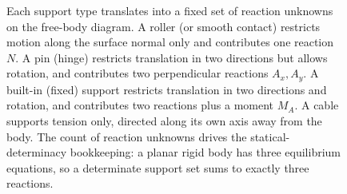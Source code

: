 \begin{figure}[htbp]
\caption[Canonical two-dimensional supports and their reactions]{Each
support type translates into a fixed set of reaction unknowns on the
free-body diagram. A roller (or smooth contact) restricts motion along
the surface normal only and contributes one reaction $N$. A pin (hinge)
restricts translation in two directions but allows rotation, and
contributes two perpendicular reactions $A_x, A_y$. A built-in (fixed)
support restricts translation in two directions and rotation, and
contributes two reactions plus a moment $M_A$. A cable supports tension
only, directed along its own axis away from the body. The count of
reaction unknowns drives the statical-determinacy bookkeeping: a planar
rigid body has three equilibrium equations, so a determinate support
set sums to exactly three reactions.}
\label{fig:vol03ch01:constraint-reactions}
\end{figure}
